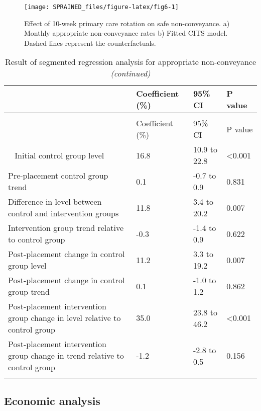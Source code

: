 \documentclass[
  a4paper,
  openany]{article}
\begin{document}
\begin{figure}

{\centering \texttt{[image: SPRAINED\_files/figure-latex/fig6-1]} 

}

\caption{Effect of 10-week primary care rotation on safe non-conveyance. a) Monthly appropriate non-conveyance rates b) Fitted CITS model. Dashed lines represent the counterfactuals.}\label{fig:fig6}
\end{figure}

\begin{longtable}[t]{>{\raggedright\arraybackslash}p{25em}lll}
\caption{\label{tab:cits-table}Result of segmented regression analysis for appropriate non-conveyance}\\
\toprule
  & Coefficient (\%) & 95\% CI & P value\\
\midrule
\endfirsthead
\caption[]{\label{tab:cits-table}Result of segmented regression analysis for appropriate non-conveyance \textit{(continued)}}\\
\toprule
  & Coefficient (\%) & 95\% CI & P value\\
\midrule
\endhead
\
\endfoot
\bottomrule
\endlastfoot
\rowcolor{gray!6}  Initial control group level & 16.8 & 10.9 to 22.8 & <0.001\\
Pre-placement control group trend & 0.1 & -0.7 to 0.9 & 0.831\\
\rowcolor{gray!6}  Difference in level between control and intervention groups & 11.8 & 3.4 to 20.2 & 0.007\\
Intervention group trend relative to control group & -0.3 & -1.4 to 0.9 & 0.622\\
\rowcolor{gray!6}  Post-placement change in control group level & 11.2 & 3.3 to 19.2 & 0.007\\
\addlinespace
Post-placement change in control group trend & 0.1 & -1.0 to 1.2 & 0.862\\
\rowcolor{gray!6}  Post-placement intervention group change in level relative to control group & 35.0 & 23.8 to 46.2 & <0.001\\
Post-placement intervention group change in trend relative to control group & -1.2 & -2.8 to 0.5 & 0.156\\*
\end{longtable}

\hypertarget{economic-analysis}{%
\subsection*{Economic analysis}\label{economic-analysis}}
\end{document}

